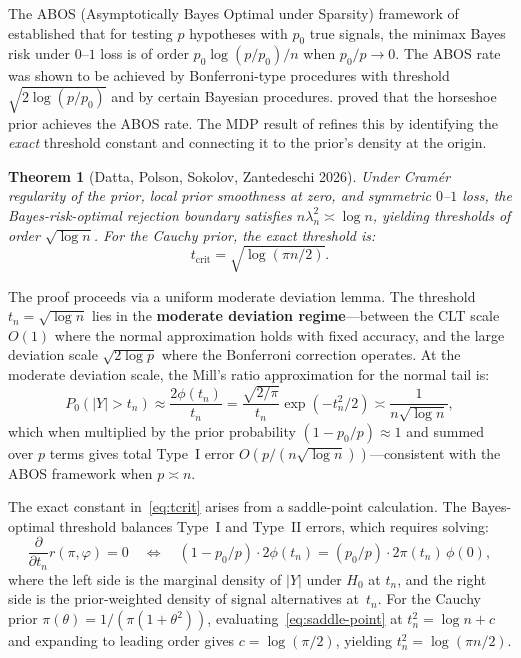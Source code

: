 \documentclass[12pt]{article}
\newtheorem{theorem}{Theorem}[section]
\newcommand{\abs}[1]{\lvert #1 \rvert}
\newcommand{\tcrit}{t_{\mathrm{crit}}}
\begin{document}
The ABOS (Asymptotically Bayes Optimal under Sparsity) framework of \citet{bogdan2011asymptotic} established that for testing $p$ hypotheses with $p_0$ true signals, the minimax Bayes risk under $0$--$1$ loss is of order $p_0 \log(p/p_0)/n$ when $p_0/p \to 0$. The ABOS rate was shown to be achieved by Bonferroni-type procedures with threshold $\sqrt{2\log(p/p_0)}$ and by certain Bayesian procedures. \citet{datta2013asymptotic} proved that the horseshoe prior achieves the ABOS rate. The MDP result of \citet{datta2026newlook} refines this by identifying the \emph{exact} threshold constant and connecting it to the prior's density at the origin.

\begin{theorem}[Datta, Polson, Sokolov, Zantedeschi 2026]\label{thm:mdp}
Under Cram\'er regularity of the prior, local prior smoothness at zero, and symmetric $0$--$1$ loss, the Bayes-risk-optimal rejection boundary satisfies $n\lambda_n^2 \asymp \log n$, yielding thresholds of order $\sqrt{\log n}$. For the Cauchy prior, the exact threshold is:
\begin{equation}\label{eq:tcrit}
  \tcrit = \sqrt{\log(\pi n/2)}.
\end{equation}
\end{theorem}

The proof proceeds via a uniform moderate deviation lemma. The threshold $t_n = \sqrt{\log n}$ lies in the \textbf{moderate deviation regime}---between the CLT scale $O(1)$ where the normal approximation holds with fixed accuracy, and the large deviation scale $\sqrt{2\log p}$ where the Bonferroni correction operates. At the moderate deviation scale, the Mill's ratio approximation for the normal tail is:
\[
  P_0(\abs{Y} > t_n)
  \approx \frac{2\phi(t_n)}{t_n}
  = \frac{\sqrt{2/\pi}}{t_n}\exp(-t_n^2/2)
  \asymp \frac{1}{n\sqrt{\log n}},
\]
which when multiplied by the prior probability $(1 - p_0/p) \approx 1$ and summed over $p$ terms gives total Type~I error $O(p/(n\sqrt{\log n}))$---consistent with the ABOS framework when $p \asymp n$.

The exact constant in~\eqref{eq:tcrit} arises from a saddle-point calculation. The Bayes-optimal threshold balances Type~I and Type~II errors, which requires solving:
\begin{equation}\label{eq:saddle-point}
  \frac{\partial}{\partial t_n} r(\pi, \varphi) = 0
  \quad\Longleftrightarrow\quad
  (1 - p_0/p) \cdot 2\phi(t_n) = (p_0/p) \cdot 2\pi(t_n)\,\phi(0),
\end{equation}
where the left side is the marginal density of $\abs{Y}$ under $H_0$ at $t_n$, and the right side is the prior-weighted density of signal alternatives at~$t_n$. For the Cauchy prior $\pi(\theta) = 1/(\pi(1+\theta^2))$, evaluating~\eqref{eq:saddle-point} at $t_n^2 = \log n + c$ and expanding to leading order gives $c = \log(\pi/2)$, yielding $t_n^2 = \log(\pi n/2)$.
\end{document}

